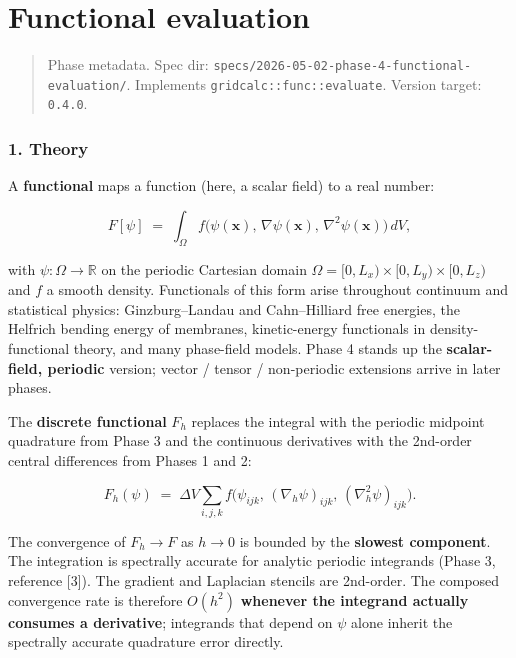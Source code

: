 \chapter{Functional evaluation}
\label{chap:dev:functional-evaluation}

\begin{quote}
Phase metadata. Spec dir:
\passthrough{\lstinline!specs/2026-05-02-phase-4-functional-evaluation/!}.
Implements \passthrough{\lstinline!gridcalc::func::evaluate!}. Version
target: \passthrough{\lstinline!0.4.0!}.
\end{quote}

\subsection{1. Theory}\label{theory}

A \textbf{functional} maps a function (here, a scalar field) to a real
number:

\[
F[\psi] \;=\; \int_{\Omega} f\bigl(\psi(\mathbf{x}),\, \nabla\psi(\mathbf{x}),\, \nabla^2\psi(\mathbf{x})\bigr)\, dV,
\]

with \(\psi : \Omega \to \mathbb{R}\) on the periodic Cartesian domain
\(\Omega = [0, L_x) \times [0, L_y) \times [0, L_z)\) and \(f\) a smooth
density. Functionals of this form arise throughout continuum and
statistical physics: Ginzburg--Landau and Cahn--Hilliard free energies,
the Helfrich bending energy of membranes, kinetic-energy functionals in
density-functional theory, and many phase-field models. Phase 4 stands
up the \textbf{scalar-field, periodic} version; vector / tensor /
non-periodic extensions arrive in later phases.

The \textbf{discrete functional} \(F_h\) replaces the integral with the
periodic midpoint quadrature from Phase 3 and the continuous derivatives
with the 2nd-order central differences from Phases 1 and 2:

\[
F_h(\psi) \;=\; \Delta V \sum_{i,j,k} f\bigl(\psi_{ijk},\, (\nabla_h \psi)_{ijk},\, (\nabla^2_h \psi)_{ijk}\bigr).
\]

The convergence of \(F_h \to F\) as \(h \to 0\) is bounded by the
\textbf{slowest component}. The integration is spectrally accurate for
analytic periodic integrands (Phase 3, reference {[}3{]}). The gradient
and Laplacian stencils are 2nd-order. The composed convergence rate is
therefore \(O(h^2)\) \textbf{whenever the integrand actually consumes a
derivative}; integrands that depend on \(\psi\) alone inherit the
spectrally accurate quadrature error directly.

